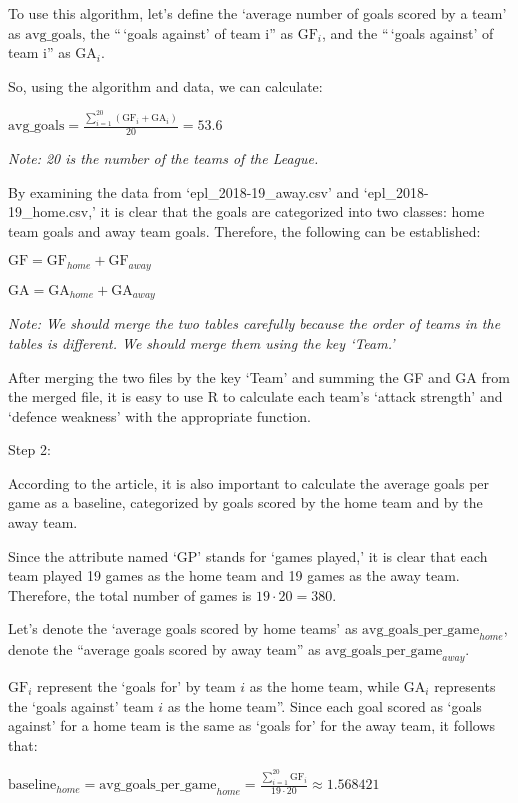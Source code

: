 \documentclass[
]{article}
\begin{document}
To use this algorithm, let's define the `average number of goals scored
by a team' as \(\text{avg\_goals}\), the ``\,`goals against' of team i''
as \(\text{GF}_i\), and the ``\,`goals against' of team i'' as
\(\text{GA}_i\).

So, using the algorithm and data, we can calculate:

\(\text{avg\_goals}=\frac{\sum_{i=1}^{20}(\text{GF}_i+\text{GA}_i)}{20}=53.6\)

\emph{Note: 20 is the number of the teams of the League.}

By examining the data from `epl\_2018-19\_away.csv' and
`epl\_2018-19\_home.csv,' it is clear that the goals are categorized
into two classes: home team goals and away team goals. Therefore, the
following can be established:

\(\text{GF}=\text{GF}_{home}+\text{GF}_{away}\)

\(\text{GA}=\text{GA}_{home}+\text{GA}_{away}\)

\emph{Note: We should merge the two tables carefully because the order
of teams in the tables is different. We should merge them using the key
`Team.'}

After merging the two files by the key `Team' and summing the GF and GA
from the merged file, it is easy to use R to calculate each team's
`attack strength' and `defence weakness' with the appropriate function.

Step 2:

According to the article, it is also important to calculate the average
goals per game as a baseline, categorized by goals scored by the home
team and by the away team.

Since the attribute named `GP' stands for `games played,' it is clear
that each team played 19 games as the home team and 19 games as the away
team. Therefore, the total number of games is \(19\cdot20=380\).

Let's denote the `average goals scored by home teams' as
\(\text{avg\_goals\_per\_game}_{home}\), denote the ``average goals
scored by away team'' as \(\text{avg\_goals\_per\_game}_{away}\).

\(\text{GF}_i\) represent the `goals for' by team \(i\) as the home
team, while \(\text{GA}_i\) represents the `goals against' team \(i\) as
the home team''. Since each goal scored as `goals against' for a home
team is the same as `goals for' for the away team, it follows that:

\(\text{baseline}_{home}=\text{avg\_goals\_per\_game}_{home}=\frac{\sum_{i=1}^{20}\text{GF}_i}{19\cdot20}\approx1.568421\)
\end{document}
